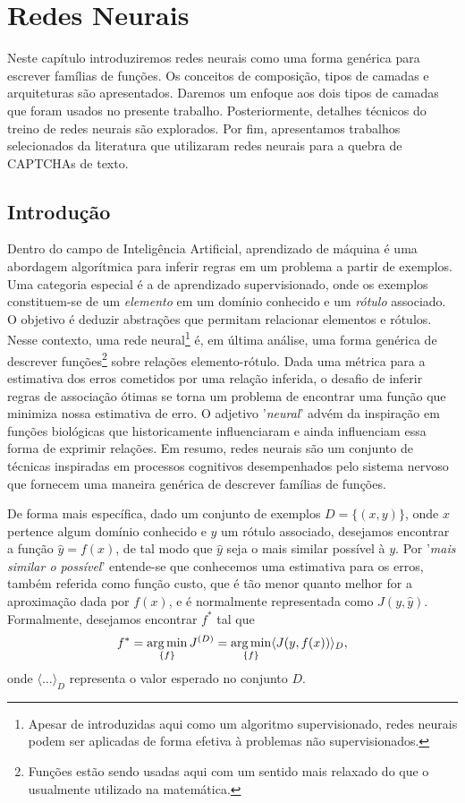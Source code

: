 \chapter{Redes Neurais} \label{cap:neurais}

Neste capítulo introduziremos redes neurais como uma forma genérica para escrever famílias de funções. Os conceitos de composição, tipos de camadas e arquiteturas são apresentados. Daremos um enfoque aos dois tipos de camadas que foram usados no presente trabalho. Posteriormente, detalhes técnicos do treino de redes neurais são explorados. Por fim, apresentamos trabalhos selecionados da literatura que utilizaram redes neurais para a quebra de CAPTCHAs de texto.

\section{Introdução}

Dentro do campo de Inteligência Artificial, aprendizado de máquina é uma abordagem algorítmica para inferir regras em um problema a partir de exemplos. Uma categoria especial é a de aprendizado supervisionado, onde os exemplos constituem-se de um \textit{elemento} em um domínio conhecido e um \textit{rótulo} associado. O objetivo é deduzir abstrações que permitam relacionar elementos e rótulos. Nesse contexto, uma rede neural\footnote{Apesar de introduzidas aqui como um algoritmo supervisionado, redes neurais podem ser aplicadas de forma efetiva à problemas não supervisionados.} é, em última análise, uma forma genérica de descrever funções\footnote{Funções estão sendo usadas aqui com um sentido mais relaxado do que o usualmente utilizado na matemática.} sobre relações elemento-rótulo. Dada uma métrica para a estimativa dos erros cometidos por uma relação inferida, o desafio de inferir regras de associação ótimas se torna um problema de encontrar uma função que minimiza nossa estimativa de erro. O adjetivo '\textit{neural}' advém da inspiração em funções biológicas que historicamente influenciaram e ainda influenciam essa forma de exprimir relações. Em resumo, redes neurais são um conjunto de técnicas inspiradas em processos cognitivos desempenhados pelo sistema nervoso que fornecem uma maneira genérica de descrever famílias de funções.

De forma mais específica, dado um conjunto de exemplos $D = \{(x, y)\}$, onde $x$  pertence algum domínio conhecido e $y$ um rótulo associado, desejamos encontrar a função $\hat{y} = f(x)$, de tal modo que $\hat{y}$ seja o mais similar possível à $y$. Por '\textit{mais similar o possível}' entende-se que conhecemos uma estimativa para os erros, também referida como função custo, que é tão menor quanto melhor for a aproximação dada por $f(x)$, e é normalmente representada como $J(y, \hat{y})$. Formalmente, desejamos encontrar $f^*$ tal que
\begin{equation}
f^* = \operatorname*{arg\,min}_{\{f\}} J^{(D)} = \operatorname*{arg\,min}_{\{f\}} \langle J(y, f(x)) \rangle_{D},
\end{equation}   
onde $\langle \ldots \rangle_{D}$ representa o valor esperado no conjunto $D$.

